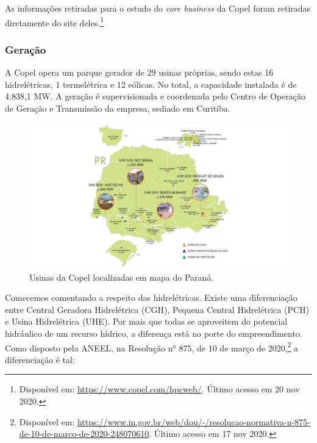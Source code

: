 \documentclass[grad,numbers]{coppe}
\begin{document}
  As informações retiradas para o estudo do \emph{core business} da Copel foram retiradas diretamente do site deles.\footnote{Disponível em: \url{https://www.copel.com/hpcweb/}. Último acesso em 20 nov 2020.}

  \hypertarget{gerauxe7uxe3o}{%
  \subsubsection{Geração}\label{gerauxe7uxe3o}}

  A Copel opera um parque gerador de 29 usinas próprias, sendo estas 16 hidrelétricas, 1 termelétrica e 12 eólicas. No total, a capacidade instalada é de 4.838,1 MW. A geração é supervisionada e coordenada pelo Centro de Operação de Geração e Transmissão da empresa, sediado em Curitiba.
  \begin{figure}[H]
  \includegraphics[width=1\linewidth]{img/usinas_copel} \caption{Usinas da Copel localizadas em mapa do Paraná.}\label{fig:unnamed-chunk-2}
  \end{figure}
  Comecemos comentando a respeito das hidrelétricas. Existe uma diferenciação entre Central Geradora Hidrelétrica (CGH), Pequena Central Hidrelétrica (PCH) e Usina Hidrelétrica (UHE). Por mais que todas se aproveitem do potencial hidráulico de um recurso hídrico, a diferença está no porte do empreendimento. Como disposto pela ANEEL, na Resolução n° 875, de 10 de março de 2020,\footnote{Disponível em: \url{https://www.in.gov.br/web/dou/-/resolucao-normativa-n-875-de-10-de-marco-de-2020-248070610}. Último acesso em 17 nov 2020.} a diferenciação é tal:
\end{document}
